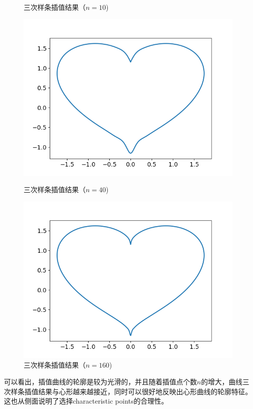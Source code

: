 \documentclass{ctexart}
\begin{document}
\begin{sloppypar}
\begin{figure}[H]
\begin{minipage}[t]{0.5\linewidth}
    \caption{三次样条插值结果（$n=10$)}
  \end{minipage}
  \label{fig10}
\end{figure}
\begin{figure}[H]
  \begin{minipage}[t]{0.5\linewidth}
    \centering
    \includegraphics[scale = 0.45]{fig//ProblemE_heartplot_40.png}
    \caption{三次样条插值结果（$n=40$)}
  \end{minipage}
  \begin{minipage}[t]{0.5\linewidth}
    \centering
    \includegraphics[scale = 0.45]{fig//ProblemE_heartplot_160.png}
    \caption{三次样条插值结果（$n=160$)}
  \end{minipage}
  \label{fig11}
\end{figure}
可以看出，插值曲线的轮廓是较为光滑的，并且随着插值点个数$n$的增大，曲线三次样条插值结果与心形越来越接近，同时可以很好地反映出心形曲线的轮廓特征。这也从侧面说明了选择characteristic points的合理性。


\end{sloppypar}
\end{document}
